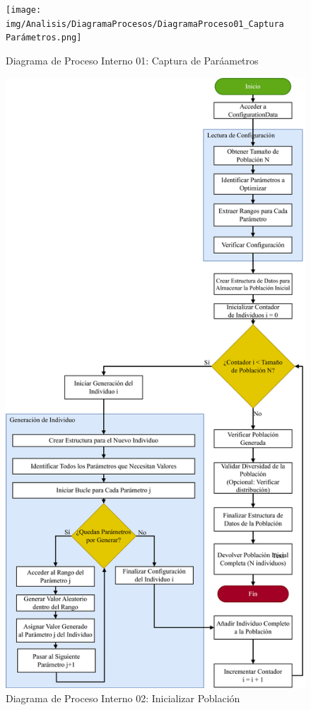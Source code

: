 \begin{figure}[H]
    \centering
    \texttt{[image: img/Analisis/DiagramaProcesos/DiagramaProceso01\_Captura Parámetros.png]}
    \caption{Diagrama de Proceso Interno 01: Captura de Paráametros}%
    \label{fig:process_diagram01}
\end{figure}

\begin{figure}[H]
    \centering
    \includegraphics[width=\textwidth]{img/Analisis/DiagramaProcesos/DiagramaProceso02_InicializarPoblacion.png}
    \caption{Diagrama de Proceso Interno 02: Inicializar Población}%
    \label{fig:process_diagram02}
\end{figure}

